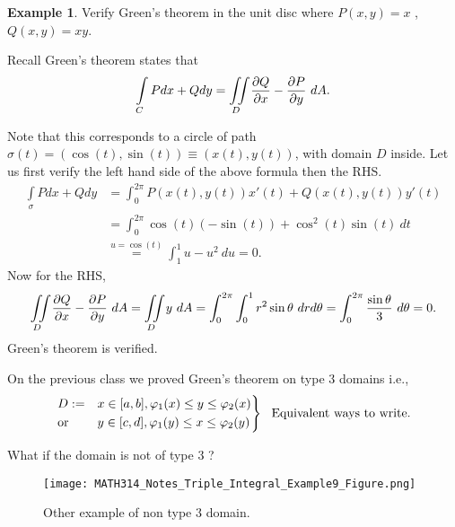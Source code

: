 \documentclass[
	12pt,
	]{article}
\theoremstyle{custom}
\theoremstyle{custom}
\theoremstyle{custom}
\theoremstyle{custom}
\theoremstyle{custom}
\theoremstyle{definition}
\newtheorem{example}{Example}[section]
\theoremstyle{example}
\theoremstyle{note}
\theoremstyle{remark}
\theoremstyle{example}
\newcounter{theo}[section]\setcounter{theo}{0}
\numberwithin{equation}{subsection}
\begin{document}
  				\begin{example}
  					Verify Green's theorem in the unit disc where $P(x,y) =x$ ,  $Q(x,y) = xy$.
  					
  					\noindent Recall Green's theorem states that 
  					$$ \int\limits_{C} Pdx +Qdy = \iint\limits_{D} \pdv{Q}{x} - \pdv{P}{y} \ dA.$$
  					
  					\noindent Note that this corresponds to a circle of path $\sigma(t) = (\cos(t),\sin(t)) \equiv (x(t),y(t))$, with domain $D$ inside. Let us first verify the left hand side of the above formula then the RHS.
  					\begin{align*}
  						\int\limits_{\sigma}Pdx + Qdy &= \int_{0}^{2\pi}P(x(t), y(t))x'(t) + Q(x(t) ,y(t))y'(t)\\
  						&= \int_{0}^{2\pi}\cos(t)(-\sin(t))+ \cos^{2}(t)\sin(t) \ dt\\
  						&\stackrel{u = \cos(t)}{=} \int_{1}^{1}u-u^{2} \ du =0.
  					\end{align*}
  					Now for the RHS,
  					$$ \iint\limits_{D} \pdv{Q}{x} - \pdv{P}{y} \ dA = \iint\limits_{D} y \ dA = \int_{0}^{2\pi}\int_{0}^{1} r^{2}\sin \theta \ drd\theta =\int_{0}^{2\pi}\frac{\sin\theta}{3}\ d\theta = 0.$$
  					Green's theorem is verified. 
  				\end{example}
  				
  				\noindent On the previous class we proved Green's theorem on type $3$ domains i.e.,
  				\begin{equation*}
  					\begin{rcases}
  						D:= &x\in [a,b] , \varphi_{1}(x) \le y \le \varphi_{2}(x) \\
  						\text{or} \ &y\in [c,d]  , \varphi_{1}(y) \le x \le \varphi_{2}(y)
  					\end{rcases} \ \ \text{Equivalent ways to write.}
  				\end{equation*}
  				
  				What if the domain is not of type $3$ ? 
  				\begin{figure}[H]
  					\centering
  					\texttt{[image: MATH314\_Notes\_Triple\_Integral\_Example9\_Figure.png]}
  					\caption{Other example of non type $3$ domain.}
  					\captionsetup{margin = 1cm}
  				\end{figure}
  				
\end{document}
